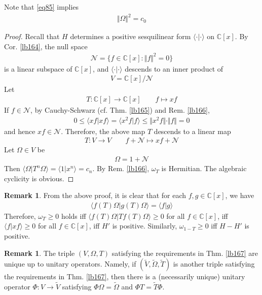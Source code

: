 \documentclass[12pt,b5paper,notitlepage]{article}
\theoremstyle{definition}
\newtheorem{rem}[df]{Remark}
\theoremstyle{plain}
\newcommand{\wtd}{\widetilde}
\newcommand{\bk}[1]{\langle {#1}\rangle}
\newcommand{\scr}{\mathscr}
\newcommand{\Cbb}{\mathbb C}
\numberwithin{equation}{section}
\begin{document}
Note that \eqref{eq85} implies
\begin{align}\label{eq86}
\Vert \Omega\Vert^2=c_0
\end{align}


\begin{proof}
Recall that $H$ determines a positive sesquilinear form $\bk{\cdot|\cdot}$ on $\Cbb[x]$. By Cor. \ref{lb164}, the null space
\begin{align}
\scr N=\{f\in\Cbb[x]:\Vert f\Vert^2=0\}
\end{align}
is a linear subspace of $\Cbb[x]$, and $\bk{\cdot|\cdot}$ descends to an inner product of
\begin{align*}
V=\Cbb[x]/\scr N
\end{align*}
Let
\begin{align*}
T:\Cbb[x]\rightarrow\Cbb[x]\qquad f\mapsto xf
\end{align*}
If $f\in\scr N$, by Cauchy-Schwarz (cf. Thm. \ref{lb165}) and Rem. \ref{lb166},
\begin{align*}
0\leq\bk{xf|xf}=\bk{x^2f|f}\leq\Vert x^2f\Vert\cdot\Vert f\Vert=0
\end{align*}
and hence $xf\in\scr N$. Therefore, the above map $T$ descends to a linear map
\begin{align}\label{eq121}
T:V\rightarrow V\qquad f+\scr N\mapsto xf+\scr N
\end{align}
Let $\Omega\in V$ be
\begin{align*}
\Omega=1+\scr N
\end{align*}
Then $\bk{\Omega|T^n\Omega}=\bk{1|x^n}=c_n$. By Rem. \ref{lb166}, $\omega_T$ is Hermitian. The algebraic cyclicity is obvious.
\end{proof}

\begin{rem}\label{lb170}
From the above proof, it is clear that for each $f,g\in\Cbb[x]$, we have
\begin{align*}
\bk{f(T)\Omega|g(T)\Omega}=\bk{f|g}
\end{align*}
Therefore, $\omega_T\geq0$ holds iff $\bk{f(T)\Omega|Tf(T)\Omega}\geq0$ for all $f\in\Cbb[x]$, iff $\bk{f|xf}\geq0$ for all $f\in\Cbb[x]$, iff $H'$ is positive. Similarly, $\omega_{1-T}\geq0$ iff $H-H'$ is positive.
\end{rem}


\begin{rem}
The triple $(V,\Omega,T)$ satisfying the requirements in Thm. \ref{lb167} are unique up to unitary operators. Namely, if $(\wtd V,\wtd\Omega,\wtd T)$ is another triple satisfying the requirements in Thm. \ref{lb167}, then there is a (necessarily unique) unitary operator $\Phi:V\rightarrow\wtd V$ satisfying $\Phi\Omega=\wtd\Omega$ and $\Phi T=\wtd T\Phi$.
\end{rem}
\end{document}
